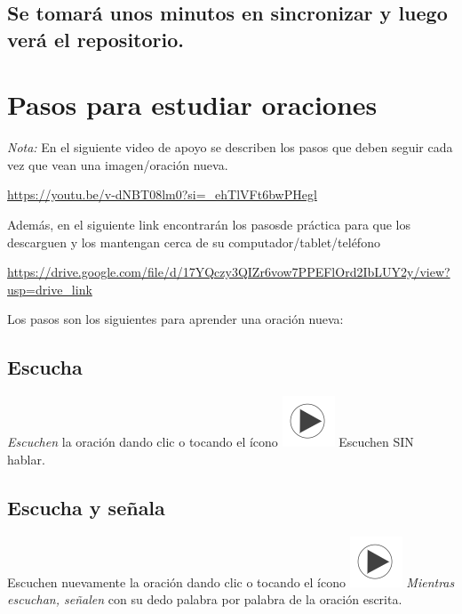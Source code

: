 \documentclass[
]{book}
\begin{document}
\hypertarget{se-tomaruxe1-unos-minutos-en-sincronizar-y-luego-veruxe1-el-repositorio.}{%
\section{Se tomará unos minutos en sincronizar y luego verá el repositorio.}\label{se-tomaruxe1-unos-minutos-en-sincronizar-y-luego-veruxe1-el-repositorio.}}

\hypertarget{cross_4}{%
\chapter{Pasos para estudiar oraciones}\label{cross_4}}

\emph{Nota:} En el siguiente video de apoyo se describen los pasos que deben seguir cada vez que vean una imagen/oración nueva.

\url{https://youtu.be/v-dNBT08lm0?si=_ehTlVFt6bwPHegl}

Además, en el siguiente link encontrarán los pasosde práctica para que los descarguen y los mantengan cerca de su computador/tablet/teléfono

\url{https://drive.google.com/file/d/17YQczy3QIZr6vow7PPEFlOrd2IbLUY2y/view?usp=drive_link}

Los pasos son los siguientes para aprender una oración nueva:

\hypertarget{cross_2}{%
\section{Escucha}\label{cross_2}}

\emph{Escuchen} la oración dando clic o tocando el ícono \includegraphics{images/play_icon.png} Escuchen SIN hablar.

\hypertarget{escucha-y-seuxf1ala}{%
\section{Escucha y señala}\label{escucha-y-seuxf1ala}}

Escuchen nuevamente la oración dando clic o tocando el ícono \includegraphics{images/play_icon.png} \emph{Mientras escuchan, señalen} con su dedo palabra por palabra de la oración escrita.
\end{document}
